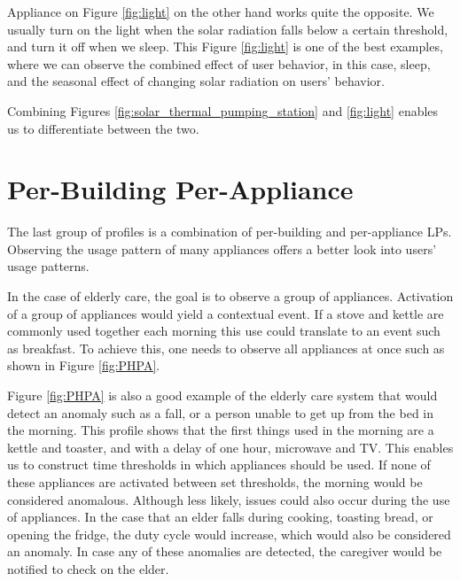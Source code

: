Appliance on Figure \ref{fig:light} on the other hand works quite the opposite.
We usually turn on the light when the solar radiation falls below a certain threshold, and turn it off when we sleep.
This Figure \ref{fig:light} is one of the best examples, where we can observe the combined effect of user behavior, in this case, sleep, and the seasonal effect of changing solar radiation on users' behavior. 

Combining Figures \ref{fig:solar_thermal_pumping_station} and \ref{fig:light} enables us to differentiate between the two. 

\section{Per-Building Per-Appliance}

The last group of profiles is a combination of per-building and per-appliance LPs.
Observing the usage pattern of many appliances offers a better look into users' usage patterns.

In the case of elderly care, the goal is to observe a group of appliances.
Activation of a group of appliances would yield a contextual event.
If a stove and kettle are commonly used together each morning this use could translate to an event such as breakfast. 
To achieve this, one needs to observe all appliances at once such as shown in Figure \ref{fig:PHPA}.

Figure \ref{fig:PHPA} is also a good example of the elderly care system that would detect an anomaly such as a fall, or a person unable to get up from the bed in the morning.
This profile shows that the first things used in the morning are a kettle and toaster, and with a delay of one hour, microwave and TV.
This enables us to construct time thresholds in which appliances should be used.
If none of these appliances are activated between set thresholds, the morning would be considered anomalous.
Although less likely, issues could also occur during the use of appliances.
In the case that an elder falls during cooking, toasting bread, or opening the fridge, the duty cycle would increase, which would also be considered an anomaly.
In case any of these anomalies are detected, the caregiver would be notified to check on the elder.

